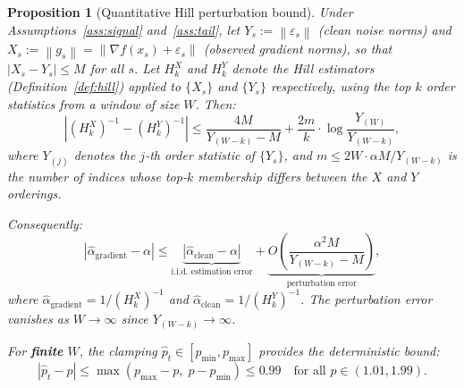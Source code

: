 \documentclass[11pt]{article}
\newtheorem{proposition}[theorem]{Proposition}
\theoremstyle{definition}
\newcommand{\norm}[1]{\left\| #1 \right\|}
\newcommand{\abs}[1]{\left| #1 \right|}
\newcommand{\phat}{\hat{p}}
\newcommand{\ahat}{\hat{\alpha}}
\begin{document}
\begin{proposition}[Quantitative Hill perturbation bound]\label{prop:hill_noniid}
Under Assumptions~\ref{ass:signal} and~\ref{ass:tail}, let
$Y_s := \norm{\varepsilon_s}$ (clean noise norms) and
$X_s := \norm{g_s} = \norm{\nabla f(x_s) + \varepsilon_s}$ (observed
gradient norms), so that $\abs{X_s - Y_s} \leq M$ for all $s$.
Let $H_k^X$ and $H_k^Y$ denote the Hill estimators (Definition~\ref{def:hill})
applied to $\{X_s\}$ and $\{Y_s\}$ respectively, using the top $k$ order
statistics from a window of size $W$. Then:
\begin{equation}\label{eq:hill_perturbation}
  \abs{(H_k^X)^{-1} - (H_k^Y)^{-1}}
  \leq \frac{4M}{Y_{(W-k)} - M}
  + \frac{2m}{k} \cdot \log\frac{Y_{(W)}}{Y_{(W-k)}},
\end{equation}
where $Y_{(j)}$ denotes the $j$-th order statistic of $\{Y_s\}$, and
$m \leq 2W \cdot \alpha M / Y_{(W-k)}$ is the number of indices whose
top-$k$ membership differs between the $X$ and $Y$ orderings.

Consequently:
\begin{equation}\label{eq:hill_total_error}
  \abs{\ahat_{\mathrm{gradient}} - \alpha}
  \leq \underbrace{\abs{\ahat_{\mathrm{clean}} - \alpha}}_{\text{i.i.d.\ estimation error}}
  + \underbrace{O\!\left(\frac{\alpha^2 M}{Y_{(W-k)} - M}\right)}_{\text{perturbation error}},
\end{equation}
where $\ahat_{\mathrm{gradient}} = 1/(H_k^X)^{-1}$ and
$\ahat_{\mathrm{clean}} = 1/(H_k^Y)^{-1}$.
The perturbation error vanishes as $W \to \infty$ since
$Y_{(W-k)} \to \infty$.

For \textbf{finite} $W$, the clamping $\phat_t \in [p_{\min}, p_{\max}]$
provides the deterministic bound:
\begin{equation}\label{eq:clamp_bound}
  \abs{\phat_t - p} \leq \max(p_{\max} - p,\; p - p_{\min}) \leq 0.99
  \quad \text{for all } p \in (1.01, 1.99).
\end{equation}
\end{proposition}
\end{document}
